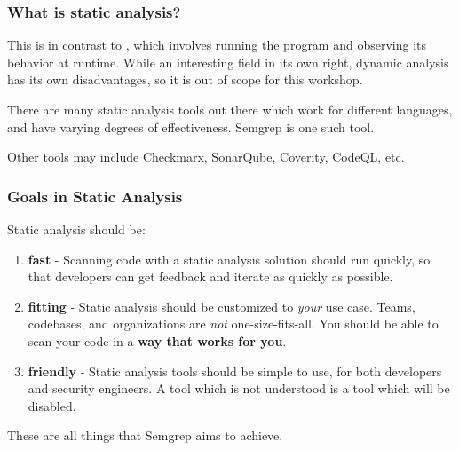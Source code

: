 \documentclass[aspectratio=169, handout]{beamer}
\begin{document}
\begin{frame}[fragile]
  \frametitle{What is static analysis?}


  \vspace{5pt}

  This is in contrast to , which involves running the program and observing
  its behavior at runtime. While an interesting field in its own right, dynamic analysis
  has its own disadvantages, so it is out of scope for this workshop.

  \vspace{10pt}

  There are many static analysis tools out there which work for different languages, and
  have varying degrees of effectiveness. Semgrep is one such tool.

  \vspace{5pt}

  Other tools may include Checkmarx, SonarQube, Coverity, CodeQL, etc.
\end{frame}


\begin{frame}[fragile]
  \frametitle{Goals in Static Analysis}

  Static analysis should be:

  \vspace{5pt}

  \begin{enumerate}
      \item \textbf{fast} - Scanning code with a static analysis solution should run
      quickly, so that developers can get feedback and iterate as quickly as possible.
      \item \textbf{fitting} - Static analysis should be customized to \textit{your}
      use case. Teams, codebases, and organizations are \textit{not} one-size-fits-all.
      You should be able to scan your code in a \textbf{way that works for you}.
      \item \textbf{friendly} - Static analysis tools should be simple to use, for
      both developers and security engineers. A tool which is not understood is a tool
      which will be disabled.
  \end{enumerate}

  \vspace{\fill}

  These are all things that Semgrep aims to achieve.
\end{frame}
\end{document}
